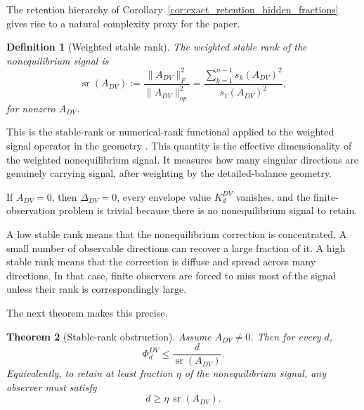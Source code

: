 \documentclass[11pt,a4paper]{article}
\numberwithin{equation}{section}
\theoremstyle{thmcompact}
\newtheorem{theorem}{Theorem}[section]
\newtheorem{definition}[theorem]{Definition}
\theoremstyle{remark}
\begin{document}
The retention hierarchy of Corollary~\ref{cor:exact_retention_hidden_fractions} gives rise to a natural complexity proxy for the paper.

\begin{definition}[Weighted stable rank]
\label{def:weighted_stable_rank}
The weighted stable rank of the nonequilibrium signal is
\begin{equation}
\operatorname{sr}(A_{DV})
:=
\frac{\|A_{DV}\|_F^2}{\|A_{DV}\|_{op}^2}
=
\frac{\sum_{k=1}^{n-1}s_k(A_{DV})^2}{s_1(A_{DV})^2},
\end{equation}
for nonzero \(A_{DV}\).
\end{definition}

This is the stable-rank or numerical-rank functional applied to the weighted signal operator in the geometry \cite{RudelsonVershynin2007}. This quantity is the effective dimensionality of the weighted nonequilibrium signal. It measures how many singular directions are genuinely carrying signal, after weighting by the detailed-balance geometry.

If \(A_{DV}=0\), then \(\Delta_{DV}=0\), every envelope value \(K_d^{DV}\) vanishes, and the finite-observation problem is trivial because there is no nonequilibrium signal to retain.

A low stable rank means that the nonequilibrium correction is concentrated. A small number of observable directions can recover a large fraction of it. A high stable rank means that the correction is diffuse and spread across many directions. In that case, finite observers are forced to miss most of the signal unless their rank is correspondingly large.

The next theorem makes this precise.

\begin{theorem}[Stable-rank obstruction]
\label{thm:stable_rank_obstruction}
Assume \(A_{DV}\neq 0\). Then for every \(d\),
\begin{equation}
\Phi_d^{DV}\le \frac{d}{\operatorname{sr}(A_{DV})}.
\end{equation}
Equivalently, to retain at least fraction \(\eta\) of the nonequilibrium signal, any observer must satisfy
\begin{equation}
d\ge \eta\,\operatorname{sr}(A_{DV}).
\end{equation}
\end{theorem}
\end{document}
